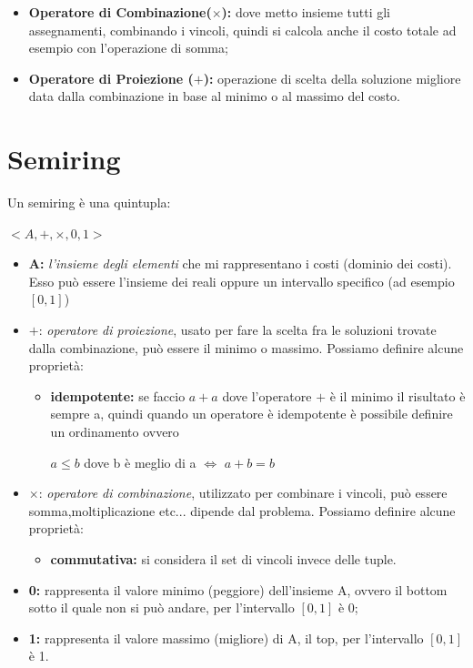 \begin{itemize}
    \item \textbf{Operatore di Combinazione($\times$):} dove metto insieme tutti gli
          assegnamenti, combinando i vincoli, quindi si calcola anche il costo totale
          ad esempio con l'operazione di somma;
    \item \textbf{Operatore di Proiezione ($+$):} operazione di scelta della
          soluzione migliore data dalla combinazione in base al minimo o al massimo
          del costo.
\end{itemize}

\section{Semiring}
Un semiring è una quintupla:
\begin{center}
    $<A, +, \times, 0, 1>$
\end{center}
\begin{itemize}
    \item \textbf{A:} \textit{l'insieme degli elementi} che mi rappresentano i costi
          (dominio dei costi). Esso può essere l'insieme dei reali oppure un
          intervallo specifico (ad esempio $[0,1]$)
    \item $+$: \textit{operatore di proiezione}, usato per fare la scelta fra le
          soluzioni trovate dalla combinazione, può essere il minimo o massimo.
          Possiamo definire alcune proprietà:
          \begin{itemize}
              \item \textbf{idempotente:} se faccio $a+a$ dove l'operatore $+$ è il
                    minimo il risultato è sempre a, quindi quando un operatore è
                    idempotente è possibile definire un ordinamento ovvero
                    \begin{center}
                        $a \leq b$ dove b è meglio di a $\Longleftrightarrow$
                        $a + b = b$
                    \end{center}
          \end{itemize}
    \item $\times$: \textit{operatore di combinazione}, utilizzato per combinare i
          vincoli, può essere somma,moltiplicazione etc... dipende dal problema.
          Possiamo definire alcune proprietà:
          \begin{itemize}
              \item \textbf{commutativa:} si considera il set di vincoli invece
                    delle tuple.
          \end{itemize}
    \item \textbf{0:} rappresenta il valore minimo (peggiore) dell'insieme A,
          ovvero il bottom sotto il quale non si può andare, per l'intervallo $[0,1]$
          è 0;
    \item \textbf{1:} rappresenta il valore massimo (migliore) di A, il top, per
          l'intervallo $[0,1]$ è 1.
\end{itemize}
